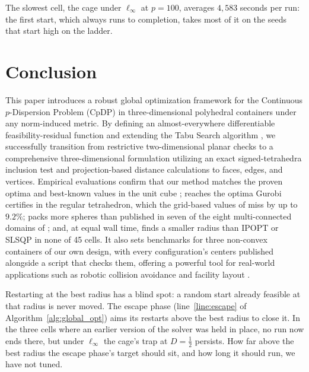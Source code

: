 \documentclass[preprint,12pt]{elsarticle}
\theoremstyle{remark}
\begin{document}
The slowest cell, the cage under $\ell_\infty$ at $p = 100$, averages $4{,}583$
seconds per run: the first start, which always runs to completion, takes most of
it on the seeds that start high on the ladder.

\section{Conclusion}

This paper introduces a robust global optimization framework for the Continuous
$p$-Dispersion Problem (CpDP) in three-dimensional polyhedral containers under
any norm-induced metric. By defining an almost-everywhere differentiable
feasibility-residual function and extending the Tabu Search algorithm
\cite{lai2024}, we successfully transition from restrictive two-dimensional
planar checks to a comprehensive three-dimensional formulation utilizing an
exact signed-tetrahedra inclusion test and projection-based distance
calculations to faces, edges, and vertices. Empirical evaluations confirm that
our method matches the proven optima and best-known values in the unit cube
\cite{schaer1966, schaer1994, packomania}; reaches the optima Gurobi certifies
in the regular tetrahedron, which the grid-based values of \citet{kazakov2018}
miss by up to $9.2\%$; packs more spheres than published in seven of the eight
multi-connected domains of \citet{stoyan2013}; and, at equal wall time, finds a
smaller radius than IPOPT or SLSQP in none of 45 cells. It also sets benchmarks
for three non-convex containers of our own design, with every configuration's
centers published alongside a script that checks them, offering a powerful tool
for real-world applications such as robotic collision avoidance and facility
layout \cite{abdulghafoor2021, loganathan2024}.

Restarting at the best radius has a blind spot: a random start already feasible
at that radius is never moved. The escape phase (line~\ref{line:escape} of
Algorithm~\ref{alg:global_opt}) aims its restarts above the best radius to close
it. In the three cells where an earlier version of the solver was held in place,
no run now ends there, but under $\ell_\infty$ the cage's trap at $D = \tfrac12$
persists. How far above the best radius the escape phase's target should sit,
and how long it should run, we have not tuned.
\end{document}
